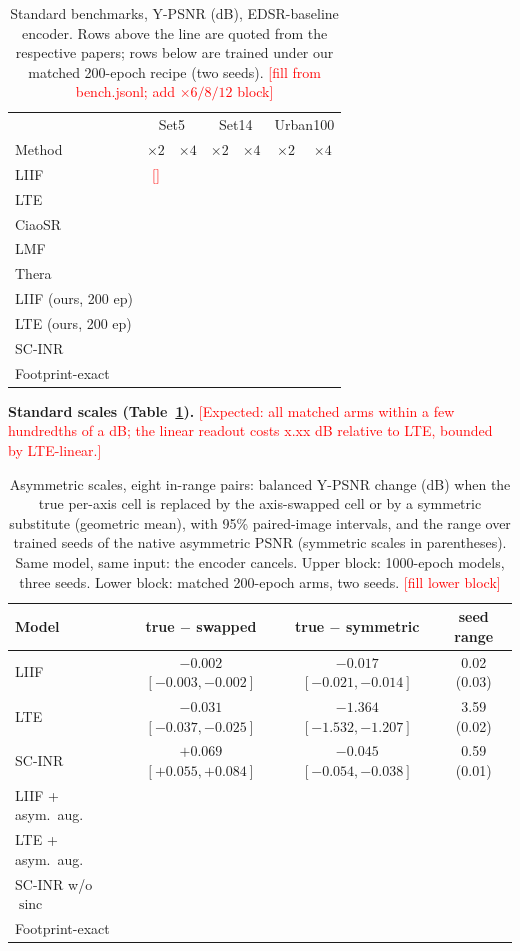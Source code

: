 \documentclass[conference]{IEEEtran}
\newcommand{\todo}[1]{\textcolor{red}{[#1]}}
\newcommand{\sinc}{\operatorname{sinc}}
\begin{document}
\begin{table}[t]\centering\footnotesize
\caption{Standard benchmarks, Y-PSNR (dB), EDSR-baseline encoder. Rows above the line are quoted from the respective papers; rows below are trained under our matched 200-epoch recipe (two seeds). \todo{fill from bench.jsonl; add $\times6/8/12$ block}}
\label{tab:std}
\begin{tabular}{lcccccc}\toprule
& \multicolumn{2}{c}{Set5} & \multicolumn{2}{c}{Set14} & \multicolumn{2}{c}{Urban100}\\
Method & $\times2$ & $\times4$ & $\times2$ & $\times4$ & $\times2$ & $\times4$\\\midrule
LIIF~\cite{chen2021liif} & \todo{} & & & & &\\
LTE~\cite{lee2022lte} & & & & & &\\
CiaoSR~\cite{cao2023ciaosr} & & & & & &\\
LMF~\cite{he2024lmf} & & & & & &\\
Thera~\cite{becker2025thera} & & & & & &\\\midrule
LIIF (ours, 200 ep) & & & & & &\\
LTE (ours, 200 ep) & & & & & &\\
SC-INR & & & & & &\\
Footprint-exact & & & & & &\\\bottomrule
\end{tabular}
\end{table}

\textbf{Standard scales (Table~\ref{tab:std}).} \todo{Expected: all matched arms within a few hundredths of a dB; the linear readout costs x.xx dB relative to LTE, bounded by LTE-linear.}

\begin{table}[t]\centering\footnotesize
\caption{Asymmetric scales, eight in-range pairs: balanced Y-PSNR change (dB) when the true per-axis cell is replaced by the axis-swapped cell or by a symmetric substitute (geometric mean), with 95\% paired-image intervals, and the range over trained seeds of the native asymmetric PSNR (symmetric scales in parentheses). Same model, same input: the encoder cancels. Upper block: 1000-epoch models, three seeds. Lower block: matched 200-epoch arms, two seeds. \todo{fill lower block}}
\label{tab:asym}
\begin{tabular}{lccc}\toprule
Model & true $-$ swapped & true $-$ symmetric & seed range\\\midrule
LIIF & $-0.002$ $[-0.003,-0.002]$ & $-0.017$ $[-0.021,-0.014]$ & 0.02 (0.03)\\
LTE & $-0.031$ $[-0.037,-0.025]$ & $-1.364$ $[-1.532,-1.207]$ & 3.59 (0.02)\\
SC-INR & $+0.069$ $[+0.055,+0.084]$ & $-0.045$ $[-0.054,-0.038]$ & 0.59 (0.01)\\\midrule
LIIF + asym.\ aug. & & &\\
LTE + asym.\ aug. & & &\\
SC-INR w/o $\sinc$ & & &\\
Footprint-exact & & &\\\bottomrule
\end{tabular}
\end{table}
\end{document}
